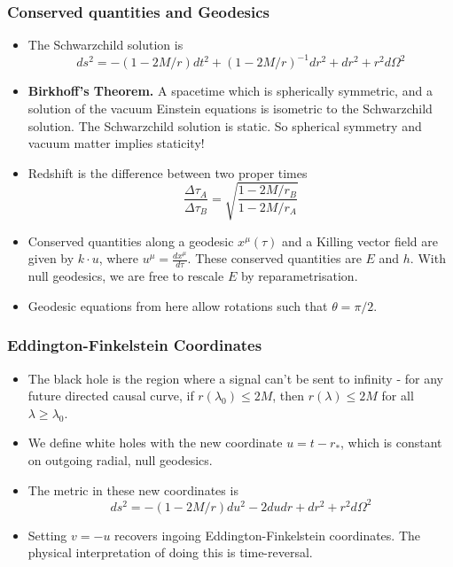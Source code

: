 \documentclass[11pt, oneside]{article}   	%
\theoremstyle{slanted}
\begin{document}
\subsubsection{Conserved quantities and Geodesics}
\begin{itemize}
\item The Schwarzchild solution is 
	\[
		ds ^ 2  =  - \left( 1 - 2M  /r  \right)  dt ^ 2 
		+ \left( 1 - 2M  /r   \right)  ^{ - 1 } dr ^ 2  + dr ^ 2 + 
		r^ 2 d \Omega ^ 2 
 \] 
\item \textbf{Birkhoff's Theorem.} A spacetime which is spherically symmetric, 
	and a solution of the vacuum Einstein 
	equations is isometric to the Schwarzchild solution. 
	The Schwarzchild solution is static. So spherical symmetry and 
	vacuum matter implies staticity!
\item Redshift is the difference between two proper times 
	\[
	 \frac{ \Delta \tau _ A }{ \Delta \tau _ B }  = \sqrt{ \frac{
	 1 - 2M  / r _ B  }{ 1 - 2M  / r _ A }} 
	\] 
\item Conserved quantities along a geodesic $ x ^ \mu \left( \tau  \right)  $ 
	and a Killing vector field are given by $ k \cdot  u $, where 
	$ u ^ \mu  = \frac{d x ^ \mu }{ d \tau } $. These conserved 
	quantities are $ E $ and $ h $. With null geodesics, 
	we are free to rescale $ E $ by reparametrisation. 
\item Geodesic equations from here 
	allow rotations such that $ \theta = \pi / 2 $. 
\end{itemize}

\subsubsection{Eddington-Finkelstein Coordinates}

\begin{itemize}
\item The black hole 
	is the region where a 
	signal can't be sent to infinity - for any 
	future directed causal curve, if $ r \left( \lambda _ 0  \right)  
	\leq 2M $, then $ r \left( \lambda  \right)  \leq 2M  $
	for all $ \lambda \geq \lambda _ 0 $. 
\item We define white holes 
	with the new coordinate $ u = t - r _ * $, 
	which is constant on outgoing radial, 
	null geodesics. 
\item The metric in these new 
	coordinates is 
	\[
	 ds ^ 2 =  - \left( 1 - 2M / r  \right)  du ^ 2 - 2 du dr 
	 + dr ^ 2 + r ^ 2 d \Omega ^ 2 
	\] 
\item Setting $ v =  - u $ recovers ingoing 
	Eddington-Finkelstein coordinates. The 
	physical interpretation 
	of doing this is time-reversal. 
\end{itemize}
\end{document}
